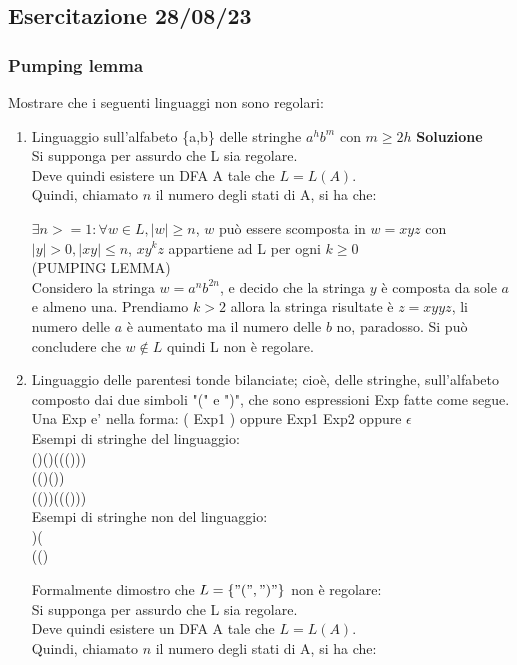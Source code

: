 \newpage
\subsection{Esercitazione 28/08/23}
\subsubsection{Pumping lemma}
Mostrare che i seguenti linguaggi non sono regolari:
\begin{enumerate}
  \item Linguaggio sull'alfabeto \{a,b\} delle stringhe $a^hb^m$ con $m\geq 2h$
\textbf{Soluzione}
\\ Si supponga per assurdo che L sia regolare.
\\ Deve quindi esistere un DFA A tale che $L=L(A)$.
\\ Quindi, chiamato $n$ il numero degli stati di A, si ha che:

$\exists n>=1: \forall w \in L, |w|\geq n$, $w$ può essere scomposta in $w=xyz$ con $|y|>0, |xy| \leq n$, 
$xy^kz$ appartiene ad L per ogni $k \geq 0$
\\ (PUMPING LEMMA)
\vspace{5mm}
\\ Considero la stringa $w=a^n b^{2n}$, e decido che la stringa $y$ è composta da sole $a$ e almeno una. Prendiamo $k>2$ allora la stringa risultate è $z=xyyz$, li numero delle $a$ è aumentato ma il numero delle $b$ no, paradosso.
Si può concludere che $w \notin L$ quindi L non è regolare.

\item Linguaggio delle parentesi tonde bilanciate; cioè, delle stringhe, sull'alfabeto composto dai due simboli "(" e ")", che sono espressioni Exp fatte come segue.
\\ Una Exp e' nella forma: ( Exp1 ) oppure Exp1 Exp2 oppure $\epsilon$
\\ Esempi di stringhe del linguaggio: 
\\ ()()((()))
\\ (()())
\\ (())((()))
\\ Esempi di stringhe non del linguaggio: 
\\ )(
\\ (()

\vspace{5mm}
Formalmente dimostro che $L=\{ "(",")"\}$ non è regolare:
\\ Si supponga per assurdo che L sia regolare.
\\ Deve quindi esistere un DFA A tale che $L=L(A)$.
\\ Quindi, chiamato $n$ il numero degli stati di A, si ha che:


\end{enumerate}

